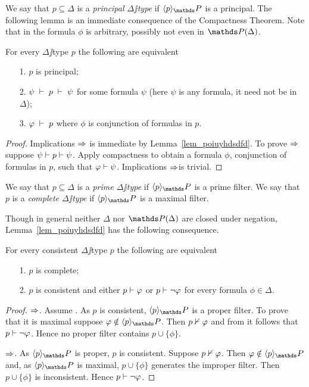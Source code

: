 \documentclass[creche.tex]{subfiles}
\begin{document}
We say that $p\subseteq\Delta$ is a \emph{principal $\Delta\jj$type\/} if $\<p\>_\PP$ is a principal.
The following lemma is an immediate consequence of the Compactness Theorem.
Note that in  the formula $\phi$ is arbitrary, possibly not even in $\PP(\Delta)$.

\begin{lemma}
For every $\Delta\jj$type $p$ the following are equivalent
\begin{itemize}
\item[1.] $p$ is principal;
\item[2.] $\psi \;\vdash\; p \;\vdash\; \psi$ for some formula $\psi$ (here $\psi$ is any formula, it need not be in $\Delta$);
\item[3.] $\varphi \;\vdash\; p$ where $\phi$ is conjunction of formulas in $p$.\QED
\end{itemize}
\end{lemma}

\begin{proof}
Implications $\Rightarrow$ is immediate by Lemma~\ref{lem_poiuyhdsdfd}.
To prove $\Rightarrow$ suppose $\psi\vdash p\vdash\psi$.
Apply compactness to obtain a formula $\phi$, conjunction of formulas in $p$, such that $\varphi\vdash\psi$.
Implications $\Rightarrow$is trivial.
\end{proof}

\begin{definition}
We say that $p\subseteq\Delta$ is a \emph{prime $\Delta\jj$type\/} if $\<p\>_\PP$ is a  prime filter.
We say that $p$ is a \emph{complete $\Delta\jj$type\/} if $\<p\>_\PP$ is a maximal filter.\QED
\end{definition}

Though in general neither $\Delta$ nor $\PP(\Delta)$ are closed under negation, Lemma~\ref{lem_poiuyhdsdfd} has the following consequence.

\begin{proposition}\label{prop_test_completezza}
For every consistent $\Delta\jj$type $p$ the following are equivalent
\begin{itemize}
\item[1.] $p$ is complete;
\item[2.] $p$ is consistent and either $p\vdash\varphi$ or $p\vdash\neg\varphi$ for every formula $\phi\in\Delta$.
\end{itemize}
\end{proposition}
\begin{proof}
$\Rightarrow$.
Assume .
As $p$ is consistent, $\<p\>_\PP$ is a proper filter.
To prove that it is maximal suppose $\phi\notin\<p\>_\PP$.
Then $p\nvdash\varphi$ and from  it follows that  $p\vdash\neg\varphi$.
Hence no proper filter contains $p\cup\{\phi\}$.

$\Rightarrow$.
As $\<p\>_\PP$ is proper, $p$ is consistent.
Suppose $p\nvdash\varphi$.
Then $\phi\notin\<p\>_\PP$ and, as $\<p\>_\PP$ is maximal, $p\cup\{\phi\}$ generates the improper filter.
Then $p\cup\{\phi\}$ is inconsistent.
Hence $p\vdash\neg\varphi$.
\end{proof}
\end{document}
